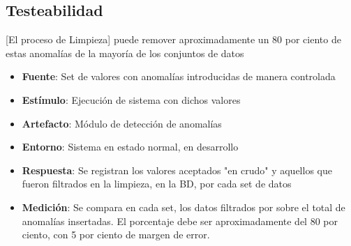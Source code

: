 \subsection{Testeabilidad}

[El proceso de Limpieza] puede remover aproximadamente un 80 por ciento de estas anomalías de la mayoría de los conjuntos de datos
\begin{itemize}
\item {\bf Fuente}: Set de valores con anomalías introducidas de manera controlada
\item {\bf Estímulo}: Ejecución de sistema con dichos valores
\item {\bf Artefacto}: Módulo de detección de anomalías
\item {\bf Entorno}: Sistema en estado normal, en desarrollo
\item {\bf Respuesta}: Se registran los valores aceptados "en crudo" y aquellos que fueron filtrados en la limpieza, en la BD, por cada set de datos
\item {\bf Medición}: Se compara en cada set, los datos filtrados por sobre el total de anomalías insertadas. El porcentaje debe ser aproximadamente del 80 por ciento, con 5 por ciento de margen de error.
\end{itemize}